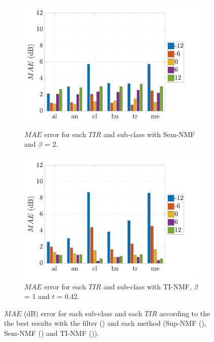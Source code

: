 \documentclass[twocolumn,a4paper,10pt]{article}
\begin{document}
\begin{figure}[t]
    \begin{subfigure}[t]{0.45\textwidth}
        \centering
      	\includegraphics[width=\linewidth]{figures/semi-sup_bar.pdf}
        \caption{$MAE$ error for each $TIR$ and sub-class with Sem-NMF and $\beta$ = 2.}
                \label{fig:TIR_class_semi}
    \end{subfigure}%
    \hfill
    \begin{subfigure}[t]{0.45\textwidth}
        \centering
        \includegraphics[width=\linewidth]{figures/TI_bar}
        \caption{$MAE$ error for each $TIR$ and sub-class with TI-NMF, $\beta$ = 1 and $t$ = 0.42.}
        \label{fig:TIR_class_TI}
    \end{subfigure}
    \caption{$MAE$ (dB) error for each sub-class and each $TIR$ according to the the best results with the filter () and each method (Sup-NMF (), Sem-NMF () and TI-NMF ()).}
    \label{fig:TIR_bar}
\end{figure}
\end{document}
